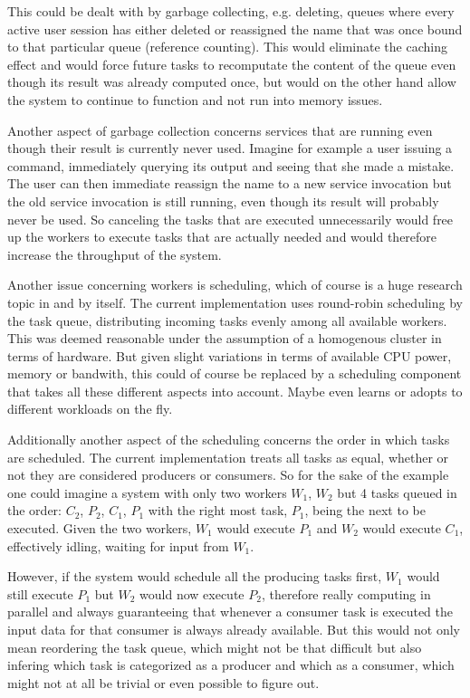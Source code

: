 This could be dealt with by garbage collecting, e.g. deleting,
queues where every active user session has either deleted or reassigned
the name that was once bound to that particular queue (reference counting).
This would eliminate the caching effect and would force future tasks
to recomputate the content of the queue even though its result
was already computed once, but would on the other hand allow the system
to continue to function and not run into memory issues.

Another aspect of garbage collection concerns services that
are running even though their result is currently never used.
Imagine for example a user issuing a command, immediately querying
its output and seeing that she made a mistake. The user can then
immediate reassign the name to a new service invocation but the
old service invocation is still running, even though its result
will probably never be used. So canceling the tasks that are
executed unnecessarily would free up the workers to execute tasks
that are actually needed and would therefore increase the throughput
of the system.
\newline

Another issue concerning workers is scheduling, which of course
is a huge research topic in and by itself. The current implementation
uses round-robin scheduling by the task queue, distributing incoming
tasks evenly among all available workers. This was deemed
reasonable under the assumption of a homogenous cluster in terms
of hardware. But given slight variations in terms of available
CPU power, memory or bandwith, this could of course be
replaced by a scheduling component that takes all these different
aspects into account. Maybe even learns or adopts to different
workloads on the fly.

Additionally another aspect of the scheduling concerns the
order in which tasks are scheduled. The current implementation
treats all tasks as equal, whether or not they are considered
producers or consumers. So for the sake of the example one could
imagine a system with only two workers $W_{1}$, $W_{2}$ but
4 tasks queued in the order: $C_{2}$, $P_{2}$, $C_{1}$, $P_{1}$
with the right most task, $P_{1}$, being the next to be executed.
Given the two workers, $W_{1}$ would execute $P_{1}$ and $W_{2}$
would execute $C_{1}$, effectively idling, waiting for input
from $W_{1}$.

However, if the system would schedule all the producing
tasks first, $W_{1}$ would still execute $P_{1}$ but $W_{2}$
would now execute $P_{2}$, therefore really computing in parallel
and always guaranteeing that whenever a consumer task is executed
the input data for that consumer is always already available.
But this would not only mean reordering the task queue, which
might not be that difficult but also infering which task is
categorized as a producer and which as a consumer, which might
not at all be trivial or even possible to figure out.
\newline

